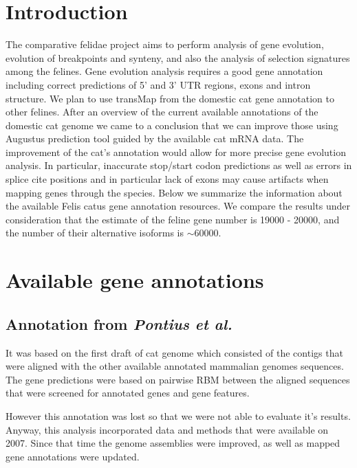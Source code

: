 \documentclass{article}
\begin{document}
\large
\centerline{}
\vspace*{20pt}
\section{Introduction}
The comparative felidae project aims to perform analysis of gene evolution, evolution of breakpoints and synteny, and also the analysis of selection signatures among the felines. Gene evolution analysis requires a good gene annotation including correct predictions of 5' and 3' UTR regions, exons and intron structure. 
We plan to use transMap from the domestic cat gene annotation to other felines.
After an overview of the current available annotations of the domestic cat genome we came to a conclusion that we can improve those using Augustus prediction tool guided by the available cat mRNA data. 
The improvement of the cat's annotation would allow for more precise gene evolution analysis.  In particular, inaccurate stop/start codon predictions as well as errors in splice cite positions and in particular lack of exons may cause artifacts when mapping genes through the species.  
Below we summarize the information about the available Felis catus gene annotation resources. We compare the results under consideration that the estimate of the feline gene number is 19000 - 20000, and the number of their alternative isoforms is $\sim$60000.


\section{Available gene annotations}
\subsection{Annotation from \textit{Pontius et al.}}
It was based on the first draft of cat genome which consisted of the contigs that were aligned with the other available annotated mammalian genomes sequences. The gene predictions were based on pairwise RBM between the aligned sequences that were screened for annotated genes and gene features.

However this annotation was lost so that we were not able to evaluate it’s results. Anyway, this analysis incorporated data and methods that were available on 2007. Since that time the genome assemblies were improved, as well as mapped gene annotations were updated.
\end{document}
